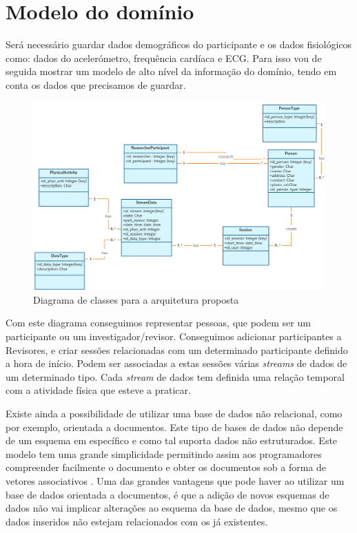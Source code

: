 \section{Modelo do domínio}
Será necessário guardar dados demográficos do participante e os dados fisiológicos como: dados do acelerómetro, frequência cardíaca e \gls{ECG}. Para isso vou de seguida mostrar um modelo de alto nível da informação do domínio, tendo em conta os dados que precisamos de guardar.

\begin{figure}[H]
  \centering
  \includegraphics[width=1\textwidth]{imgs/class-diagram.png}
  \caption[Diagrama de classes para a arquitetura proposta]{Diagrama de classes para a arquitetura proposta}
  
  \label{f:class-diagram}
\end{figure}

Com este diagrama conseguimos representar pessoas, que podem ser um participante ou um investigador/revisor. Conseguimos adicionar participantes a Revisores, e criar sessões relacionadas com um determinado participante definido a hora de início. Podem ser associadas a estas sessões várias \textit{streams} de dados de um determinado tipo. Cada \textit{stream} de dados tem definida uma relação temporal com a atividade física que esteve a praticar.
\par 
Existe ainda a possibilidade de utilizar uma base de dados não relacional, como por exemplo, orientada a documentos. Este tipo de bases de dados não depende de um esquema em específico e como tal suporta dados não estruturados. Este modelo tem uma grande simplicidade permitindo assim aos programadores compreender facilmente o documento e obter os documentos sob a forma de vetores associativos \cite{nosql}. Uma das grandes vantagens que pode haver ao utilizar um base de dados orientada a documentos, é que a adição de novos esquemas de dados não vai implicar alterações ao esquema da base de dados, mesmo que os dados inseridos não estejam relacionados com os já existentes.





